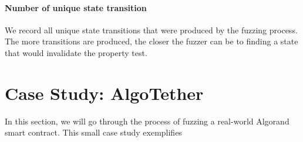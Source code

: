 \paragraph{Number of unique state transition} We record all unique state transitions that were produced by the fuzzing process.
The more transitions are produced, the closer the fuzzer can be to finding a state that would invalidate the property test.

\section{Case Study: AlgoTether}
In this section, we will go through the process of fuzzing a real-world Algorand smart contract.
This small case study exemplifies
